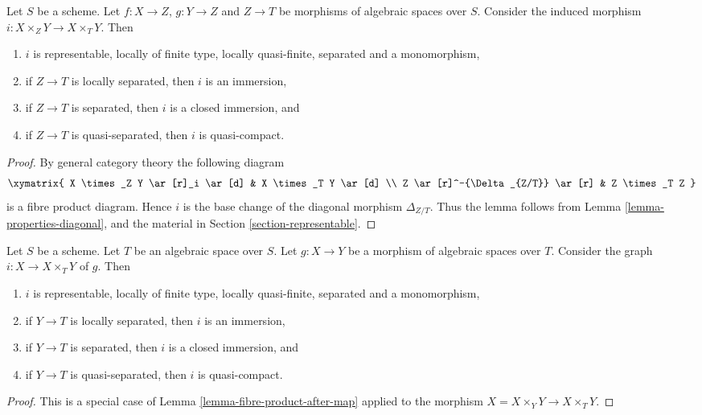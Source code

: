 \begin{lemma}
\label{lemma-fibre-product-after-map}
Let $S$ be a scheme. Let $f : X \to Z$, $g : Y \to Z$ and $Z \to T$
be morphisms of algebraic spaces over $S$. Consider the induced morphism
$i : X \times_Z Y \to X \times_T Y$. Then
\begin{enumerate}
\item $i$ is representable, locally of finite type, locally quasi-finite,
separated and a monomorphism,
\item if $Z \to T$ is locally separated, then $i$ is an immersion,
\item if $Z \to T$ is separated, then $i$ is a closed immersion, and
\item if $Z \to T$ is quasi-separated, then $i$ is quasi-compact.
\end{enumerate}
\end{lemma}

\begin{proof}
By general category theory the following diagram
$$
\xymatrix{
X \times_Z Y \ar[r]_i \ar[d] & X \times_T Y \ar[d] \\
Z \ar[r]^-{\Delta_{Z/T}} \ar[r] & Z \times_T Z
}
$$
is a fibre product diagram. Hence $i$ is the base change of the
diagonal morphism $\Delta_{Z/T}$. Thus the lemma follows
from Lemma \ref{lemma-properties-diagonal}, and the material in
Section \ref{section-representable}.
\end{proof}

\begin{lemma}
\label{lemma-semi-diagonal}
Let $S$ be a scheme. Let $T$ be an algebraic space over $S$.
Let $g : X \to Y$ be a morphism of algebraic spaces over $T$.
Consider the graph $i : X \to X \times_T Y$ of $g$. Then
\begin{enumerate}
\item $i$ is representable, locally of finite type, locally quasi-finite,
separated and a monomorphism,
\item if $Y \to T$ is locally separated, then $i$ is an immersion,
\item if $Y \to T$ is separated, then $i$ is a closed immersion, and
\item if $Y \to T$ is quasi-separated, then $i$ is quasi-compact.
\end{enumerate}
\end{lemma}

\begin{proof}
This is a special case of Lemma \ref{lemma-fibre-product-after-map}
applied to the morphism $X = X \times_Y Y \to X \times_T Y$.
\end{proof}

